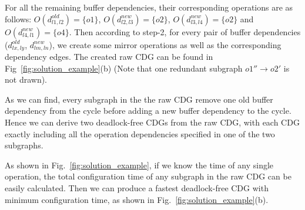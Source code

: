For all the remaining buffer dependencies, their corresponding operations are as follows: $O(d^{old}_{l1,l2}) = \{o1\}$, $O(d^{new}_{l2,l3}) = \{o2\}$, $O(d^{new}_{l3,l4}) = \{o2\}$ and $O(d^{new}_{l4,l1}) = \{o4\}$. Then according to step-2, for every pair of buffer dependencies ($d^{old}_{lx,ly}$,  $d^{new}_{lm,ln}$), we create some mirror operations as well as the corresponding dependency edges. The created raw CDG can be found in Fig~\ref{fig:solution_example}(b) (Note that one redundant subgraph $o1'' \rightarrow o2'$ is not drawn).  

As we can find, every subgraph in the the raw CDG remove one old buffer dependency from the cycle before adding a new buffer dependency to the  cycle. Hence we can derive two deadlock-free CDGs from the raw CDG, with each CDG exactly including all the operation dependencies specified in one of the two subgraphs.

As shown in Fig.~\ref{fig:solution_example}, if we know the time of any single operation, the total configuration time of any subgraph in the raw CDG can be easily calculated. Then we can produce a fastest deadlock-free CDG with minimum configuration time, as shown in Fig.~\ref{fig:solution_example}(b).


